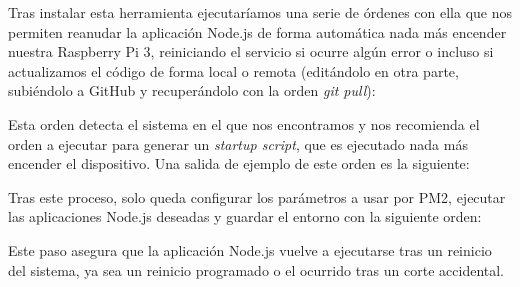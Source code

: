 \begin{appendices}
Tras instalar esta herramienta ejecutaríamos una serie de órdenes con ella que nos permiten reanudar la aplicación Node.js de forma automática nada más encender nuestra Raspberry Pi 3, reiniciando el servicio si ocurre algún error o incluso si actualizamos el código de forma local o remota (editándolo en otra parte, subiéndolo a GitHub y recuperándolo con la orden \emph{git pull}): 


Esta orden detecta el sistema en el que nos encontramos y nos recomienda el orden a ejecutar para generar un \emph{startup script}, que es ejecutado nada más encender el dispositivo. Una salida de ejemplo de este orden es la siguiente:


Tras este proceso, solo queda configurar los parámetros a usar por PM2, ejecutar las aplicaciones Node.js deseadas y guardar el entorno con la siguiente orden:


Este paso asegura que la aplicación Node.js vuelve a ejecutarse tras un reinicio del sistema, ya sea un reinicio programado o el ocurrido tras un corte accidental.


\end{appendices}
